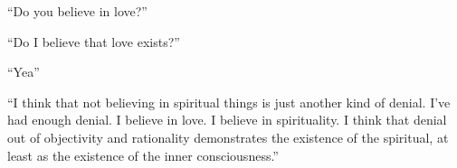 

``Do you believe in love?''

``Do I believe that love exists?''

``Yea''

``I think that not believing in spiritual things is just another kind
of denial.  I've had enough denial.  I believe in love.  I believe in
spirituality.  I think that denial out of objectivity and rationality
demonstrates the existence of the spiritual, at least as the existence
of the inner consciousness.''

\bye
